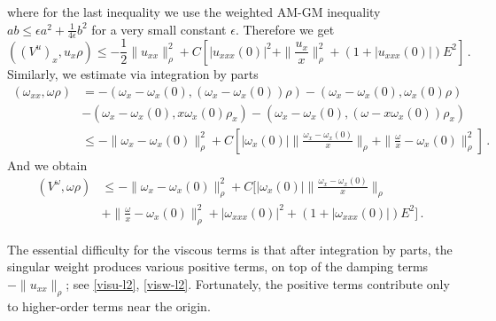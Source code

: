 \documentclass[12pt]{caltech_thesis}
\numberwithin{equation}{section}
\begin{document}
where for  the last inequality we use the weighted AM-GM inequality $ab\leq \epsilon a^2+\frac{1}{4\epsilon}b^2$ for a very small constant $\epsilon$.
Therefore we get \begin{equation}\label{visu-l2}
    ((V^u)_x,u_x\rho)\leq -\frac{1}{2}\|u_{xx}\|^2_{\rho}+C[|u_{xxx}(0)|^2+\|\frac{u_x}{x}\|_{\rho}^2 +(1+|u_{xxx}(0)|)E^2]\,.
\end{equation}
Similarly, we estimate via integration by parts$$\begin{aligned}(\omega_{xx},\omega{\rho})&=-(\omega_{x}-\omega_{x}(0),(\omega_{x}-\omega_{x}(0)){\rho})-(\omega_{x}-\omega_{x}(0),\omega_{x}(0){\rho})\\&-(\omega_{x}-\omega_{x}(0),x\omega_{x}(0){\rho_x})-(\omega_{x}-\omega_{x}(0),(\omega-x\omega_{x}(0)){\rho_x})\\&\leq-\|\omega_{x}-\omega_{x}(0)\|^2_{\rho}+C[|\omega_{x}(0)|\|\frac{\omega_{x}-\omega_{x}(0)}{x}\|_{\rho}+\|\frac{\omega}{x}-\omega_{x}(0)\|_{\rho}^2]\,.\end{aligned}$$
And we obtain
\begin{equation}\label{visw-l2}\begin{aligned}(V^\omega,\omega\rho)
   &\leq -\|\omega_{x}-\omega_{x}(0)\|^2_{\rho}+C[|\omega_{x}(0)|\|\frac{\omega_{x}-\omega_{x}(0)}{x}\|_{\rho}\\&+\|\frac{\omega}{x}-\omega_{x}(0)\|_{\rho}^2+|\omega_{xxx}(0)|^2 +(1+|\omega_{xxx}(0)|)E^2]\,.
   \end{aligned}
\end{equation}
    

   The essential difficulty for the viscous terms is that after integration by parts, the singular weight produces various positive terms, on top of the damping terms $-\|u_{xx}\|_{\rho}$; see \eqref{visu-l2}, \eqref{visw-l2}. Fortunately, the positive terms contribute only to higher-order terms near the origin.
   
\end{document}
